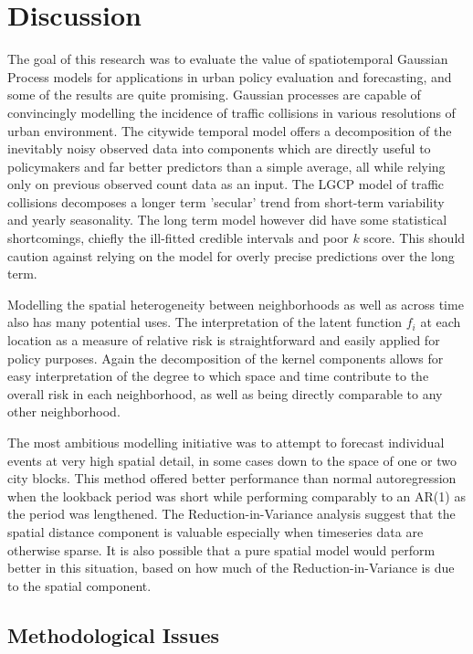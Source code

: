 \chapter{Discussion}
\label{discussion}

The goal of this research was to evaluate the value of spatiotemporal Gaussian Process models for applications in urban policy evaluation and forecasting, and some of the results are quite promising. Gaussian processes are capable of convincingly modelling the incidence of traffic collisions in various resolutions of urban environment. The citywide temporal model offers a decomposition of the inevitably noisy observed data into components which are directly useful to policymakers and far better predictors than a simple average, all while relying only on previous observed count data as an input. The LGCP model of traffic collisions decomposes a longer term 'secular' trend from short-term variability and yearly seasonality. The long term model however did have some statistical shortcomings, chiefly the ill-fitted credible intervals and poor $k$ score. This should caution against relying on the model for overly precise predictions over the long term. \par

Modelling the spatial heterogeneity between neighborhoods as well as across time also has many potential uses. The interpretation of the latent function $f_i$ at each location as a measure of relative risk is straightforward and easily applied for policy purposes. Again the decomposition of the kernel components allows for easy interpretation of the degree to which space and time contribute to the overall risk in each neighborhood, as well as being directly comparable to any other neighborhood. \par

The most ambitious modelling initiative was to attempt to forecast individual events at very high spatial detail, in some cases down to the space of one or two city blocks. This method offered better performance than normal autoregression when the lookback period was short while performing comparably to an AR(1) as the period was lengthened. The Reduction-in-Variance analysis suggest that the spatial distance component is valuable especially when timeseries data are otherwise sparse. It is also possible that a pure spatial model would perform better in this situation, based on how much of the Reduction-in-Variance is due to the spatial component.

\section{Methodological Issues}

